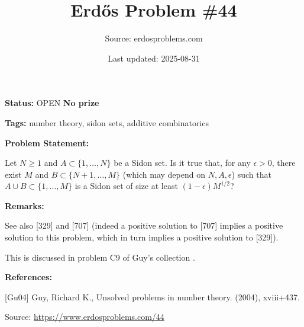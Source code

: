 \documentclass{article}
\title{Erd\H{o}s Problem \#44}
\date{Last updated: 2025-08-31}
\author{Source: erdosproblems.com}
\begin{document}
\maketitle

\noindent\textbf{Status:} OPEN \quad \textbf{No prize}

\noindent\textbf{Tags:} number theory, sidon sets, additive combinatorics

\medskip
\noindent\textbf{Problem Statement:}

Let $N\geq 1$ and $A\subset \{1,\ldots,N\}$ be a Sidon set. Is it true that, for any $\epsilon>0$, there exist $M$ and $B\subset \{N+1,\ldots,M\}$ (which may depend on $N,A,\epsilon$) such that $A\cup B\subset \{1,\ldots,M\}$ is a Sidon set of size at least $(1-\epsilon)M^{1/2}$?

\bigskip
\noindent\textbf{Remarks:}

See also [329] and [707] (indeed a positive solution to [707] implies a positive solution to this problem, which in turn implies a positive solution to [329]).

This is discussed in problem C9 of Guy's collection \cite{Gu04}.

\bigskip
\noindent\textbf{References:}

[Gu04] Guy, Richard K., Unsolved problems in number theory. (2004), xviii+437.

\bigskip
\noindent\small{Source: \url{https://www.erdosproblems.com/44}}
\end{document}
